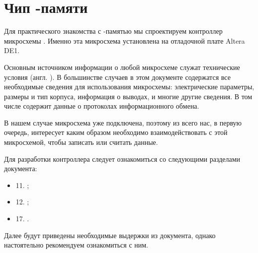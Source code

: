% 

\section{Чип -памяти }

\par{Для практического знакомства с -памятью мы спроектируем контроллер микросхемы . Именно эта микросхема установлена на отладочной плате Altera DE1.}
\par{Основным источником информации о любой микросхеме служат технические условия (англ. ). В большинстве случаев в этом документе содержатся все необходимые сведения для использования микросхемы: электрические параметры, размеры и тип корпуса, информация о выводах, и многие другие сведения. В том числе  содержит данные о протоколах информационного обмена.}
\par{В нашем случае микросхема уже подключена, поэтому из всего  нас, в первую очередь, интересует каким образом необходимо взаимодействовать с этой микросхемой, чтобы записать или считать данные.}
\par{Для разработки контроллера следует ознакомиться со следующими разделами документа:
\begin{itemize}[noitemsep,label={}]
  \item 11. ;
  \item 12. ;
  \item 17. .
\end{itemize}}
\par{Далее будут приведены необходимые выдержки из документа, однако настоятельно рекомендуем ознакомиться с ним.}


